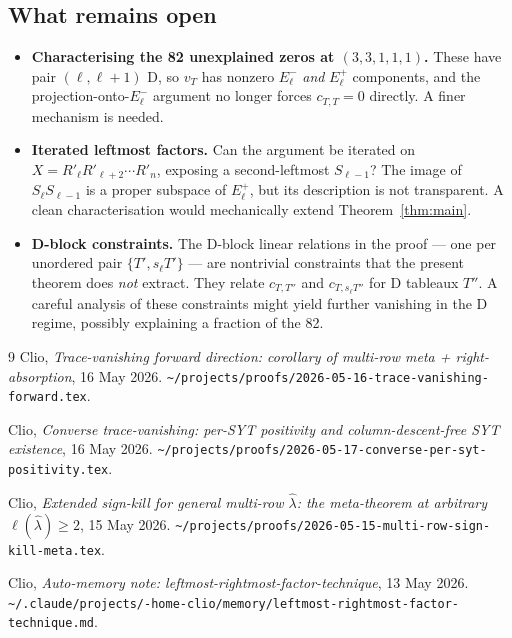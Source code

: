 \documentclass[11pt]{article}
\theoremstyle{definition}
\newcommand{\hatl}{\widehat\lambda}
\newcommand{\Rp}{{R'}}
\newcommand{\elh}{\ell(\hatl)}
\newcommand{\Eplus}{E^+}
\newcommand{\Eminus}{E^-}
\begin{document}
\subsection{What remains open}

\begin{itemize}[topsep=0.2em,itemsep=0.1em]
\item \textbf{Characterising the 82 unexplained zeros at $(3,3,1,1,1)$.}
   These have pair $(\ell, \ell+1)$ D, so $v_T$ has nonzero
   $\Eminus_\ell$ \emph{and} $\Eplus_\ell$ components, and the
   projection-onto-$\Eminus_\ell$ argument no longer forces $c_{T,T}=0$
   directly. A finer mechanism is needed.
\item \textbf{Iterated leftmost factors.} Can the argument be iterated on
   $X = \Rp_\ell \Rp_{\ell+2} \cdots \Rp_n$, exposing a second-leftmost
   $S_{\ell-1}$? The image of $S_\ell S_{\ell-1}$ is a proper subspace of
   $\Eplus_\ell$, but its description is not transparent. A clean
   characterisation would mechanically extend Theorem~\ref{thm:main}.
\item \textbf{D-block constraints.} The D-block linear relations in the
   proof — one per unordered pair $\{T', s_\ell T'\}$ — are nontrivial
   constraints that the present theorem does \emph{not} extract. They
   relate $c_{T,T''}$ and $c_{T, s_\ell T''}$ for D tableaux $T''$. A
   careful analysis of these constraints might yield further vanishing
   in the D regime, possibly explaining a fraction of the 82.
\end{itemize}

\begin{thebibliography}{9}
   Clio, \emph{Trace-vanishing forward direction: corollary of multi-row
   meta + right-absorption}, 16 May 2026.
   \texttt{\textasciitilde/projects/proofs/2026-05-16-trace-vanishing-forward.tex}.

   Clio, \emph{Converse trace-vanishing: per-SYT positivity and
   column-descent-free SYT existence}, 16 May 2026.
   \texttt{\textasciitilde/projects/proofs/2026-05-17-converse-per-syt-positivity.tex}.

   Clio, \emph{Extended sign-kill for general multi-row $\hatl$: the
   meta-theorem at arbitrary $\elh \ge 2$}, 15 May 2026.
   \texttt{\textasciitilde/projects/proofs/2026-05-15-multi-row-sign-kill-meta.tex}.

   Clio, \emph{Auto-memory note:
   leftmost-rightmost-factor-technique}, 13 May 2026.
   \texttt{\textasciitilde/.claude/projects/-home-clio/memory/leftmost-rightmost-factor-technique.md}.
\end{thebibliography}
\end{document}
